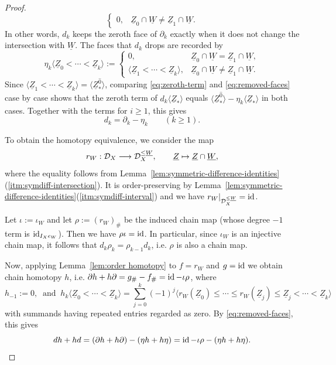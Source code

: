 \documentclass[a4paper,leqno]{amsart}
\begin{document}
{\begin{proof}
\begin{equation}
\begin{cases}
 0, & \underline{Z}_0\cap\underline{W}\neq\underline{Z}_1\cap\underline{W}.
 \end{cases}
 \label{eq:zeroth-term}
\end{equation}
In other words, $d_k$ keeps the zeroth face of $\partial_k$ exactly when it does not change the intersection with $\underline{W}$. The faces that $d_k$ drops are recorded by
\begin{equation}
 \eta_k\langle\underline{Z}_0<\cdots<\underline{Z}_k\rangle:=
 \begin{cases}
 0, & \underline{Z}_0\cap\underline{W}=\underline{Z}_1\cap\underline{W},\\
 \langle\underline{Z}_1<\cdots<\underline{Z}_k\rangle, & \underline{Z}_0\cap\underline{W}\neq\underline{Z}_1\cap\underline{W}.
 \end{cases}
 \label{eq:removed-faces}
\end{equation}
Since $\langle\underline{Z}_1<\cdots<\underline{Z}_k\rangle=\langle\underline{Z}_\ast^{\widehat{0}}\rangle$, comparing \eqref{eq:zeroth-term} and \eqref{eq:removed-faces} case by case shows that the zeroth term of $d_k\langle\underline{Z}_\ast\rangle$ equals $\langle\underline{Z}_\ast^{\widehat{0}}\rangle-\eta_k\langle\underline{Z}_\ast\rangle$ in both cases. Together with the terms for $i\geq1$, this gives
\[
 d_k=\partial_k-\eta_k\qquad(k\geq1).
\]

To obtain the homotopy equivalence, we consider
the map \[
r_W: \mathcal D_X \longrightarrow \mathcal D_X^{\le\underline{W}}, \qquad \underline{Z}\mapsto \underline{Z}\cap\underline{W}, 
\]
where the equality follows from Lemma~\ref{lem:symmetric-difference-identities}\textup{(\ref{itm:symdiff-intersection})}. 
It is order-preserving by Lemma~\ref{lem:symmetric-difference-identities}\textup{(\ref{itm:symdiff-interval})} and we have $r_W|_{\mathcal D_X^{\leq\underline{W}}} = \operatorname{id}$. 

Let $\iota:=\iota_W$ and let $\rho:=(r_W)_\#$ be the induced chain map (whose degree $-1$ term is $\operatorname{id}_{I_Xe_W}$).
Then we have $\rho\iota=\operatorname{id}$.  In particular, since $\iota_W$ is an injective chain map, it follows that $d_k\rho_k=\rho_{k-1}d_k$, i.e. $\rho$ is also a chain map.

Now, applying Lemma~\ref{lem:order homotopy} to $f=r_W$ and $g=\operatorname{id}$ we obtain chain homotopy $h$, i.e. $\partial h+h\partial=g_\# - f_\# = \operatorname{id}-\iota\rho$, where 
\[
h_{-1}:=0, \;\;\text{and}\;\;
 h_k\langle\underline{Z}_0<\cdots<\underline{Z}_k\rangle
 =\sum_{j=0}^k(-1)^j
 \langle r_W(\underline{Z}_0)\leq\cdots\leq r_W(\underline{Z}_j)\leq \underline{Z}_j<\cdots<\underline{Z}_k\rangle
\]
with summands having repeated entries regarded as zero. 
By \eqref{eq:removed-faces}, this gives
\[
 dh+hd=(\partial h+h\partial) - (\eta h+h\eta) = \operatorname{id}-\iota\rho-(\eta h+h\eta).
\]


\end{proof}}
\end{document}

